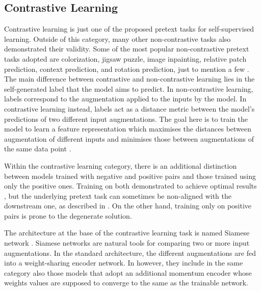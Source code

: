 \documentclass{article}
\begin{document}
\subsection{Contrastive Learning}
Contrastive learning is just one of the proposed pretext tasks for self-supervised learning. Outside of this category, many other non-contrastive tasks also demonstrated their validity. Some of the most popular non-contrastive pretext tasks adopted are colorization, jigsaw puzzle, image inpainting, relative patch prediction, context prediction, and rotation prediction, just to mention a few \cite{self_classifier}\cite{byol}. The main difference between contrastive and non-contrastive learning lies in the self-generated label that the model aims to predict. In non-contrastive learning, labels correspond to the augmentation applied to the inputs by the model. In contrastive learning instead, labels act as a distance metric between the model's predictions of two different input augmentations. The goal here is to train the model to learn a feature representation which maximises the distances between augmentation of different inputs and minimises those between augmentations of the same data point \cite{byol}. 

Within the contrastive learning category, there is an additional distinction between models trained with negative and positive pairs and those trained using only the positive ones.
Training on both demonstrated to achieve optimal results \cite{simclr}, but the underlying pretext task can sometimes be non-aligned with the downstream one, as described in \cite{self_classifier}. On the other hand, training only on positive pairs is prone to the degenerate solution. 

The architecture at the base of the contrastive learning task is named Siamese network \cite{siamese_network}. Siamese networks are natural tools for comparing two or more input augmentations. In the standard architecture, the different augmentations are fed into a weight-sharing encoder network. In \cite{simsiam} however, they include in the same category also those models that adopt an additional momentum encoder whose weights values are supposed to converge to the same as the trainable network.

\end{document}
